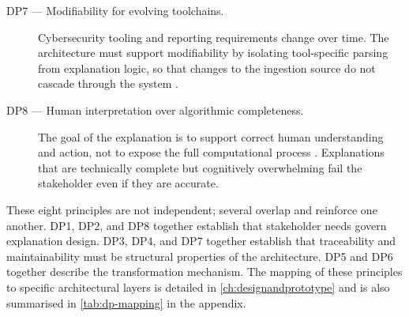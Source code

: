 \begin{description}
  \item[DP7 — Modifiability for evolving toolchains.] Cybersecurity tooling and reporting requirements change over time. The architecture must support modifiability by isolating tool-specific parsing from explanation logic, so that changes to the ingestion source do not cascade through the system \cite{bass2012software, parnas1972modules}.

  \item[DP8 — Human interpretation over algorithmic completeness.] The goal of the explanation is to support correct human understanding and action, not to expose the full computational process \cite{cranor2008framework, werlinger2008ids, miller2019explanation}. Explanations that are technically complete but cognitively overwhelming fail the stakeholder even if they are accurate.

\end{description}

These eight principles are not independent; several overlap and reinforce one another. DP1, DP2, and DP8 together establish that stakeholder needs govern explanation design. DP3, DP4, and DP7 together establish that traceability and maintainability must be structural properties of the architecture. DP5 and DP6 together describe the transformation mechanism. The mapping of these principles to specific architectural layers is detailed in \cref{ch:designandprototype} and is also summarised in \cref{tab:dp-mapping} in the appendix.